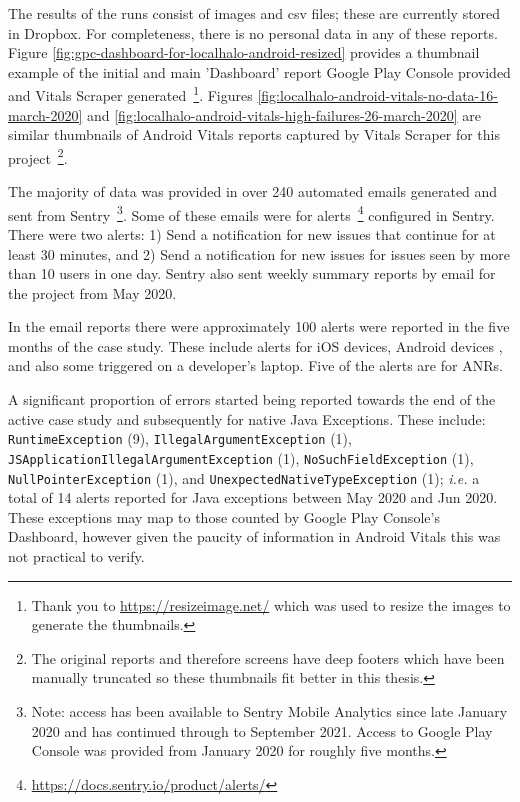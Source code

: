 The results of the runs consist of images and csv files; these are currently stored in Dropbox. For completeness, there is no personal data in any of these reports. Figure \ref{fig:gpc-dashboard-for-localhalo-android-resized} provides a thumbnail example of the initial and main 'Dashboard' report Google Play Console provided and Vitals Scraper generated~\footnote{Thank you to \url{https://resizeimage.net/} which was used to resize the images to generate the thumbnails.}. Figures \ref{fig:localhalo-android-vitals-no-data-16-march-2020} and \ref{fig:localhalo-android-vitals-high-failures-26-march-2020} are similar thumbnails of Android Vitals reports captured by Vitals Scraper for this project~\footnote{The original reports and therefore screens have deep footers which have been manually truncated so these thumbnails fit better in this thesis.}.



The majority of data was provided in over 240 automated emails generated and sent from Sentry~\footnote{Note: access has been available to Sentry Mobile Analytics since late January 2020 and has continued through to September 2021. Access to Google Play Console was provided from  January 2020 for roughly five months.}. Some of these emails were for alerts~\footnote{\url{https://docs.sentry.io/product/alerts/}} configured in Sentry. There were two alerts: 1) Send a notification for new issues that continue for at least 30 minutes, and 2) Send a notification for new issues for issues seen by more than 10 users in one day. Sentry also sent weekly summary reports by email for the project from  May 2020.

In the email reports there were approximately 100 alerts were reported in the five months of the case study. These include alerts for iOS devices, Android devices %
, and also some triggered on a developer's laptop. Five of the alerts are for ANRs. 

A significant proportion of errors started being reported towards the end of the active case study and subsequently for native Java Exceptions. These include: \texttt{RuntimeException} (9), \texttt{IllegalArgumentException} (1), \texttt{JSApplicationIllegalArgumentException} (1), \texttt{NoSuchFieldException} (1), \texttt{NullPointerException} (1), and \texttt{UnexpectedNativeTypeException} (1); \emph{i.e.} a total of 14 alerts reported for Java exceptions between  May 2020 and  Jun 2020. %
These exceptions may map to those counted by Google Play Console's Dashboard, however given the paucity of information in Android Vitals this was not practical to verify.

